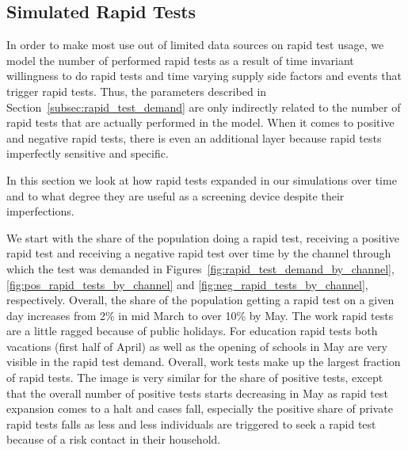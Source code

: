 \subsection{Simulated Rapid Tests}
\label{subsec:results_rapid_test_statistics}

In order to make most use out of limited data sources on rapid test usage, we model the
number of performed rapid tests as a result of time invariant willingness to do rapid
tests and time varying supply side factors and events that trigger rapid tests. Thus,
the parameters described in Section~\ref{subsec:rapid_test_demand} are only indirectly
related to the number of rapid tests that are actually performed in the model. When it
comes to positive and negative rapid tests, there is even an additional layer because
rapid tests imperfectly sensitive and specific.

In this section we look at how rapid tests expanded in our simulations over time and to
what degree they are useful as a screening device despite their imperfections.

We start with the share of the population doing a rapid test, receiving a positive rapid
test and receiving a negative rapid test over time by the channel through which the test
was demanded in Figures~\ref{fig:rapid_test_demand_by_channel},
\ref{fig:pos_rapid_tests_by_channel} and \ref{fig:neg_rapid_tests_by_channel},
respectively. Overall, the share of the population getting a rapid test on a given day
increases from 2\% in mid March to over 10\% by May. The work rapid tests are a little
ragged because of public holidays. For education rapid tests both vacations (first half
of April) as well as the opening of schools in May are very visible in the rapid test
demand. Overall, work tests make up the largest fraction of rapid tests. The image is
very similar for the share of positive tests, except that the overall number of positive
tests starts decreasing in May as rapid test expansion comes to a halt and cases fall,
especially the positive share of private rapid tests falls as less and less individuals
are triggered to seek a rapid test because of a risk contact in their household.

